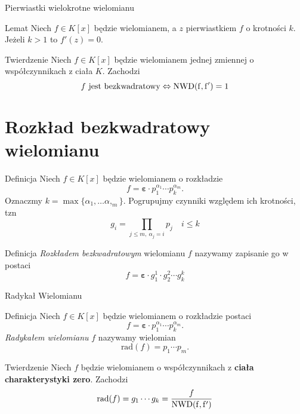 \documentclass{beamer}
\newcommand{\NWD}{\rm{NWD}}
\newcommand{\rad}{\textrm{rad}}
\renewcommand{\epsilon}{\bm{\varepsilon}}
\begin{document}
\begin{frame}{Pierwiastki wielokrotne wielomianu}
    \begin{block}{Lemat}
        Niech $f \in K[x]$ będzie wielomianem, a $z$ pierwiastkiem $f$ o krotności $k$.
        Jeżeli $k > 1$ to $f'(z) = 0$. 
    \end{block}
    \pause 
    \begin{block}{Twierdzenie}
        Niech $f \in K[x]$ będzie wielomianem jednej zmiennej o współczynnikach z ciała $K$. Zachodzi 
        $$f \text{ jest bezkwadratowy} \Leftrightarrow \NWD(f,f') = 1$$
    \end{block}
\end{frame}

\section{Rozkład bezkwadratowy wielomianu}
\begin{frame}{Definicja}
    Niech $f \in K[x]$ będzie wielomianem o rozkładzie 
    $$f = \epsilon \cdot p_1^{\alpha_1} \cdots p_k^{\alpha_m}.$$
    Oznaczmy $k = \max \{\alpha_1 , \ldots \alpha,_m\}$.
    Pogrupujmy czynniki względem ich krotności, tzn 
    $$ g_i = \prod_{j \leq m, \ \alpha_j = i}p_j \quad i \leq k $$
    \begin{block}{Definicja}
        \textit{Rozkładem bezkwadratowym} wielomianu $f$ nazywamy zapisanie go w postaci
        $$f = \epsilon \cdot g_1^{1} \cdot g_2^2 \cdots g_k^k$$
    \end{block}
\end{frame}

\begin{frame}{Radykał Wielomianu}
    \begin{block}{Definicja}
        Niech $f \in K[x]$ będzie wielomianem o rozkładzie postaci
        $$f =\epsilon \cdot p_1^{\alpha_1} \cdots p_k^{\alpha_m}.$$
        \textit{Radykałem wielomianu} $f$ nazywamy wielomian 
        $$ \rad(f) = p_1 \cdots p_m.$$
    \end{block}
    \pause
    \begin{block}{Twierdzenie}
        Niech $f$ będzie wielomianem  o współczynnikach z \textbf{ciała charakterystyki zero}.
        Zachodzi 
        $$\rad (f) = g_1 \cdots g_k = \frac{f}{\NWD(f,f')}$$
    \end{block}
\end{frame}
\end{document}
